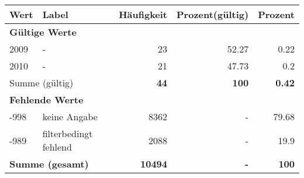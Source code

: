      \begin{longtable}{lXrrr}
     \toprule
     \textbf{Wert} & \textbf{Label} & \textbf{Häufigkeit} & \textbf{Prozent(gültig)} & \textbf{Prozent} \\
     \endhead
     \midrule
     \multicolumn{5}{l}{\textbf{Gültige Werte}}\\

     2009 &
     \multicolumn{1}{X}{ -  } &


       \num{23} &
       \num[round-mode=places,round-precision=2]{52,27} &
         \num[round-mode=places,round-precision=2]{0,22} \\

     2010 &
     \multicolumn{1}{X}{ -  } &


       \num{21} &
       \num[round-mode=places,round-precision=2]{47,73} &
         \num[round-mode=places,round-precision=2]{0,2} \\
     \midrule
     \multicolumn{2}{l}{Summe (gültig)} &
       \textbf{\num{44}} &
     \textbf{100} &
       \textbf{\num[round-mode=places,round-precision=2]{0,42}} \\
     \multicolumn{5}{l}{\textbf{Fehlende Werte}}\\
       -998 &
       keine Angabe &
         \num{8362} &
        - &
         \num[round-mode=places,round-precision=2]{79,68} \\
       -989 &
       filterbedingt fehlend &
         \num{2088} &
        - &
         \num[round-mode=places,round-precision=2]{19,9} \\
     \midrule
     \multicolumn{2}{l}{\textbf{Summe (gesamt)}} &
          \textbf{\num{10494}} &
        \textbf{-} &
        \textbf{100} \\
     \bottomrule
     \end{longtable}
     
